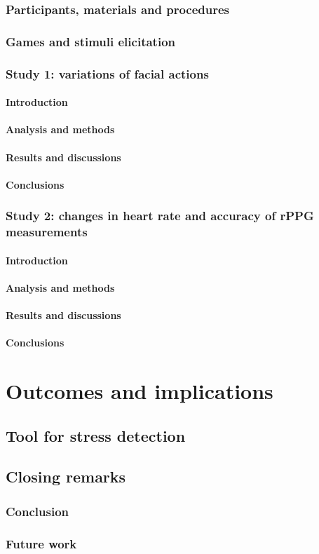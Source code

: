   \section{Participants, materials and procedures}
  \section{Games and stimuli elicitation}
  \section{Study 1: variations of facial actions}
    \subsection{Introduction}
    \subsection{Analysis and methods}
    \subsection{Results and discussions}
    \subsection{Conclusions}
  \section{Study 2: changes in heart rate and accuracy of rPPG measurements}
    \subsection{Introduction}
    \subsection{Analysis and methods}
    \subsection{Results and discussions}
    \subsection{Conclusions}

\part{Outcomes and implications}

\chapter{Tool for stress detection}
\chapter{Closing remarks}
  \section{Conclusion}
  \section{Future work}
